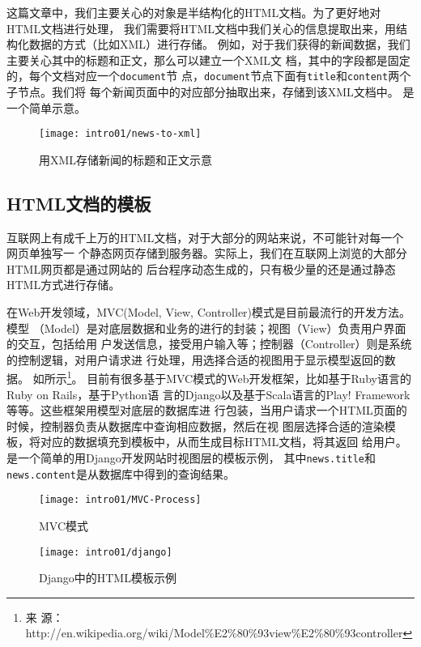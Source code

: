 这篇文章中，我们主要关心的对象是半结构化的HTML文档。为了更好地对HTML文档进行处理，
我们需要将HTML文档中我们关心的信息提取出来，用结构化数据的方式（比如XML）进行存储。
例如，对于我们获得的新闻数据，我们主要关心其中的标题和正文，那么可以建立一个XML文
档，其中的字段都是固定的，每个文档对应一个\texttt{document}节
点，\texttt{document}节点下面有\texttt{title}和\texttt{content}两个子节点。我们将
每个新闻页面中的对应部分抽取出来，存储到该XML文档中。
是一个简单示意。
\begin{figure}[h]
  \centering
  \texttt{[image: intro01/news-to-xml]}
  \caption{用XML存储新闻的标题和正文示意}
  \label{intro:fig:blog-to-xml}
\end{figure}

\subsection{HTML文档的模板}
\label{sec:htmltemplateintro}
互联网上有成千上万的HTML文档，对于大部分的网站来说，不可能针对每一个网页单独写一
个静态网页存储到服务器。实际上，我们在互联网上浏览的大部分HTML网页都是通过网站的
后台程序动态生成的，只有极少量的还是通过静态HTML方式进行存储。

在Web开发领域，MVC(Model, View, Controller)模式是目前最流行的开发方法。模型
（Model）是对底层数据和业务的进行的封装；视图（View）负责用户界面的交互，包括给用
户发送信息，接受用户输入等；控制器（Controller）则是系统的控制逻辑，对用户请求进
行处理，用选择合适的视图用于显示模型返回的数据。
如所示\footnote{来
  源：http://en.wikipedia.org/wiki/Model\%E2\%80\%93view\%E2\%80\%93controller}。
目前有很多基于MVC模式的Web开发框架，比如基于Ruby语言的Ruby on Rails，基于Python语
言的Django以及基于Scala语言的Play! Framework等等。这些框架用模型对底层的数据库进
行包装，当用户请求一个HTML页面的时候，控制器负责从数据库中查询相应数据，然后在视
图层选择合适的渲染模板，将对应的数据填充到模板中，从而生成目标HTML文档，将其返回
给用户。是一个简单的用Django开发网站时视图层的模板示例，
其中\texttt{news.title}和\texttt{news.content}是从数据库中得到的查询结果。
\begin{figure}
  \begin{minipage}[t]{0.5\linewidth}
  \centering
  \texttt{[image: intro01/MVC-Process]}
  \caption{MVC模式}
  \label{intro:fig:mvc}
  \end{minipage}
  \begin{minipage}[t]{0.5\linewidth}
  \centering
  \texttt{[image: intro01/django]}
  \caption{Django中的HTML模板示例}
  \label{intro:fig:django}
  \end{minipage}
\end{figure}

